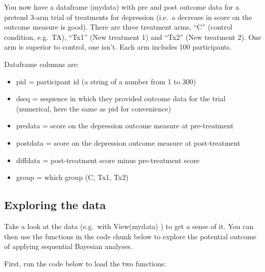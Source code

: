 \documentclass[
]{book}
\providecommand{\tightlist}{%
  \setlength{\itemsep}{0pt}\setlength{\parskip}{0pt}}
\begin{document}
You now have a dataframe (mydata) with pre and post outcome data for a pretend 3-arm trial of treatments for depression (i.e.~a decrease in score on the outcome measure is good). There are three treatment arms, ``C'' (control condition, e.g.~TA), ``Tx1'' (New treatment 1) and ``Tx2'' (New treatment 2). One arm is superior to control, one isn't. Each arm includes 100 participants.

Dataframe columns are:

\begin{itemize}
\tightlist
\item
  pid = participant id (a string of a number from 1 to 300)
\item
  dseq = sequence in which they provided outcome data for the trial (numerical, here the same as pid for convenience)
\item
  predata = score on the depression outcome measure at pre-treatment
\item
  postdata = score on the depression outcome measure at post-treatment
\item
  diffdata = post-treatment score minus pre-treatment score
\item
  group = which group (C, Tx1, Tx2)
\end{itemize}

\hypertarget{exploring-the-data}{%
\subsection{Exploring the data}\label{exploring-the-data}}

Take a look at the data (e.g.~with View(mydata) ) to get a sense of it. You can then use the functions in the code chunk below to explore the potential outcome of applying sequential Bayesian analyses.

First, run the code below to load the two functions:
\end{document}
